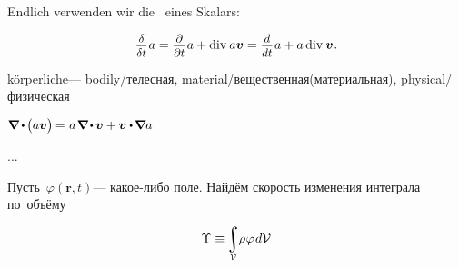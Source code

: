 \begin{otherlanguage}{russian}
\begin{tcolorbox}[breakable, enhanced, colback = orange!8, before upper={\parindent3.2ex}, parbox = false]
Endlich verwenden wir die~ eines Skalars:

\nopagebreak\vspace{-0.1em}\begin{equation*}
\scalebox{0.92}[0.92]{$\displaystyle\frac{\raisemath{-0.125em}{\delta}}{\delta t}$} \hspace{.15ex} a
= \scalebox{0.92}[0.92]{$\displaystyle\frac{\raisemath{-0.125em}{\partial}}{\partial t}$} \hspace{.15ex} a + \operatorname{div}\hspace{.1ex} a \bm{v}
= \scalebox{0.92}[0.92]{$\displaystyle\frac{\raisemath{-0.125em}{d}}{dt}$} \hspace{.15ex} a + a \operatorname{div}\hspace{.1ex} \bm{v}
\hspace{.1ex} .
\end{equation*}
\par
\end{tcolorbox}

körperliche\:--- bodily/телесная, material/вещественная(материальная), physical/физическая

${
\boldnabla \hspace{-0.1ex} \dotp \hspace{-0.15ex} \bigl( a \bm{v} \bigr) \hspace{-0.2ex} = \hspace{.1ex} a \hspace{.2ex} \boldnabla \hspace{-0.2ex} \dotp \hspace{-0.1ex} \bm{v} + \bm{v} \dotp \hspace{-0.2ex} \boldnabla a
}$

...

Пусть~${\varphi(\bm{r},t)}$\:--- какое\hbox{-}либо поле. Найдём скорость изменения интеграла по~объёму

\nopagebreak\vspace{-0.5em}\begin{equation*}
\Upsilon \equiv \hspace{-0.2ex} \scalebox{0.9}{$\displaystyle\integral\displaylimits_{\mathcal{V}}$} \hspace{-0.1ex} \rho \hspace{.1ex} \varphi \hspace{.2ex} d\mathcal{V}
\end{equation*}


\end{otherlanguage}
